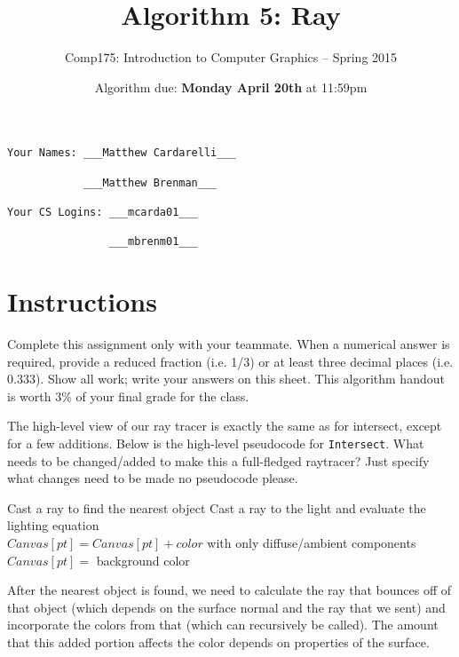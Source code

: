 \documentclass[10pt,twocolumn]{article}
\title{\Huge{\bf Algorithm 5: Ray}}
\author{Comp175: Introduction to Computer Graphics -- Spring 2015}
\date{Algorithm due:  {\bf Monday April 20th} at 11:59pm}                                         %
\begin{document}
\maketitle

\begin{verbatim}
Your Names: ___Matthew Cardarelli___

            ___Matthew Brenman___

Your CS Logins: ___mcarda01___

                ___mbrenm01___
\end{verbatim}

\section{Instructions}
Complete this assignment only with your teammate. When a numerical answer is required, provide a reduced fraction (i.e. 1/3) or at least three decimal places (i.e. 0.333). Show all work; write your answers on this sheet. This algorithm handout is worth 3\% of your final grade for the class.

\begin{framed}
\noindent{\bf[2 points]} The high-level view of our ray tracer is exactly the same as for intersect, except for a few additions. Below is the high-level pseudocode for {\tt Intersect}. What needs to be changed/added to make this a full-fledged raytracer? Just specify what changes need to be made {no pseudocode please.}

\footnotesize{
\begin{algorithmic}
	\STATE Cast a ray to find the nearest object
			\STATE Cast a ray to the light and evaluate the lighting equation\\
			\STATE $Canvas[pt] = Canvas[pt]+ color$ with only diffuse/ambient components\\
		\ENDFOR
	\ELSE 
		\STATE $Canvas[pt] =$ background color
	\ENDIF
\ENDFOR

\vspace{3em}

After the nearest object is found, we need to calculate the ray that bounces off of that object (which depends on the surface normal and the ray that we sent) and incorporate the colors from that (which can recursively be called). The amount that this added portion affects the color depends on properties of the surface.

\end{algorithmic}
}

\end{framed}
\end{document}
